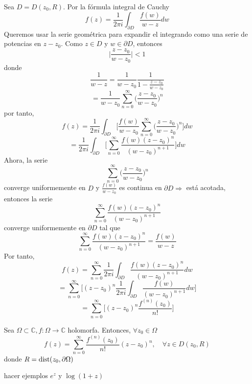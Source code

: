 \begin{dem}
  Sea $D = D(z_{0}, R)$. Por la fórmula integral de Cauchy
  \[ 
    f(z) = \frac{1}{2 \pi i} \int_{\partial{ D}}^{} \frac{f(w)}{w-z} dw 
  \] 
  Queremos usar la serie geométrica para expandir el integrando como una serie de potencias en $z -z_{0}$. Como $z \in D$ y $w \in \partial{D}$, entonces
  \[ 
    \Bigg | \frac{z-z_{0}}{w - z_{0}} \Bigg | < 1
  \] 
  donde
  \[ 
    \frac{1}{w - z} = \frac{1}{w - z_{0}} \frac{1}{1 - \frac{z - z_{0}}{w - z_{0}}} 
  \] 
  \[ 
    = \frac{1}{w - z_{0}} \sum_{n = 0}^{\infty} \Bigg ( \frac{z - z_{0}}{w - z_{0}} \Bigg )^{n} 
  \] 
  por tanto,
  \[ 
    f(z) = \frac{1}{2 \pi i} \int_{\partial{D}}^{} \Bigg[ \frac{f(w)}{w - z_{0}} \sum_{n = 0}^{\infty} \big ( \frac{z - z_{0}}{w - z_{0}} \big )^{n}  \Bigg] dw 
  \] 
  \[ 
    = \frac{1}{ 2 \pi i} \int_{\partial{D}}^{} \Bigg[ \sum_{n = 0}^{\infty} \frac{f(w)(z -z_{0})^{n}}{(w-z_{0})^{n+1}} \Bigg] dw 
  \] 
  Ahora, la serie
  \[ 
    \sum_{n = 0}^{\infty} \Bigg ( \frac{z - z_{0}}{w - z_{0}} \Bigg )^{n}  
  \] 
  converge uniformemente en $D$ y $\frac{f(w)}{w - z_{0}}$ es continua en $\partial{D} \Rightarrow$ está acotada, entonces la serie
  \[ 
    \sum_{n = 0}^{\infty} \frac{f(w)(z -z_{0})^{n}}{(w-z_{0})^{n+1}} 
  \] 
  converge uniformemente en $\partial{D}$ tal que 
  \[ 
    \sum_{n = 0}^{\infty} \frac{f(w)(z -z_{0})^{n}}{(w-z_{0})^{n+1}} = \frac{f(w)}{w - z}
  \] 
  Por tanto, 
  \[ 
    f(z) = \sum_{n = 0}^{\infty} \frac{1}{ 2 \pi i} \int_{\partial{D}}^{} \frac{f(w)(z -z_{0})^{n}}{(w-z_{0})^{n+1}} dw 
  \] 
  \[ 
    = \sum_{n = 0}^{\infty} \Bigg [ (z - z_{0})^{n} \frac{1}{ 2 \pi i} \int_{\partial{D}}^{} \frac{f(w)}{(w-z_{0})^{n+1}} dw \Bigg ]
  \] 
  \[ 
    = \sum_{n = 0}^{\infty} \Bigg[ (z - z_{0})^{n} \frac{f^{(n)}(z_{0})}{n!} \Bigg] 
  \] 
\end{dem}

\begin{cor}
  Sea $\Omega \subset \mathbb{C}, f: \Omega \to \mathbb{C}$ holomorfa. Entonces, $\forall z_{0} \in \Omega$
  \[ 
    f(z) = \sum_{n = 0}^{\infty} \frac{f^{(n)}(z_{0})}{n!}(z - z_{0})^{n}, \quad \forall z \in D(z_{0},R)
  \] 
  donde $R = \operatorname{dist} (z_{0}, \partial{\Omega})$
\end{cor}

\begin{ejm}
  hacer ejemplos $e ^{z}$ y $\log (1 + z)$
\end{ejm}
